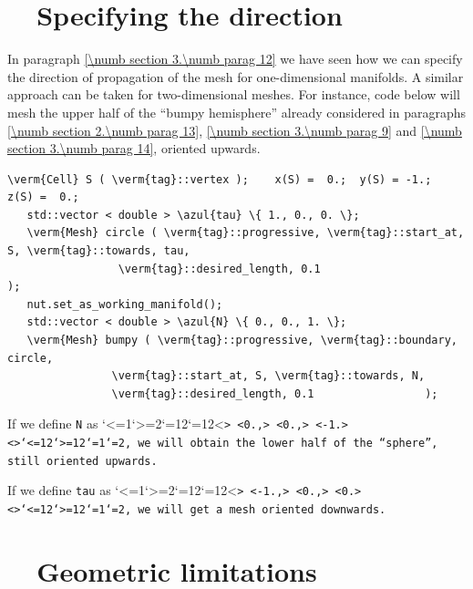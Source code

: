\section{~~Specifying the direction}\label{\numb section 3.\numb parag 15}

In paragraph \ref{\numb section 3.\numb parag 12} we have seen how we can specify the direction
of propagation of the mesh for one-dimensional manifolds.
A similar approach can be taken for two-dimensional meshes.
For instance, code below will mesh the upper half of the ``bumpy hemisphere'' already considered
in paragraphs \ref{\numb section 2.\numb parag 13}, \ref{\numb section 3.\numb parag 9} and
\ref{\numb section 3.\numb parag 14}, oriented upwards.

\begin{Verbatim}[commandchars=\\\{\},formatcom=\small\tt,frame=single,
   label=parag-\ref{\numb section 3.\numb parag 15}.cpp,rulecolor=\color{coment},
   baselinestretch=0.94,framesep=2mm                                            ]
   \verm{Cell} S ( \verm{tag}::vertex );    x(S) =  0.;  y(S) = -1.;  z(S) =  0.;
   std::vector < double > \azul{tau} \{ 1., 0., 0. \};
   \verm{Mesh} circle ( \verm{tag}::progressive, \verm{tag}::start_at, S, \verm{tag}::towards, tau,
                 \verm{tag}::desired_length, 0.1                               );
   nut.set_as_working_manifold();
   std::vector < double > \azul{N} \{ 0., 0., 1. \};
   \verm{Mesh} bumpy ( \verm{tag}::progressive, \verm{tag}::boundary, circle,
                \verm{tag}::start_at, S, \verm{tag}::towards, N,
                \verm{tag}::desired_length, 0.1                 );
\end{Verbatim}

If we define {\small\tt N} as \catcode`<=1\catcode`>=2\catcode`{=12\catcode`}=12<\small\tt {>
<\small\tt 0.,> <\small\tt 0.,> <\small\tt -1.> <\small\tt }>\catcode`<=12\catcode`>=12\catcode`{=1\catcode`}=2, we will obtain
the lower half of the ``sphere'', still oriented upwards.

If we define {\small\tt tau} as \catcode`<=1\catcode`>=2\catcode`{=12\catcode`}=12<\small\tt {>
<\small\tt -1.,> <\small\tt 0.,> <\small\tt 0.> <\small\tt }>\catcode`<=12\catcode`>=12\catcode`{=1\catcode`}=2, we will get a mesh
oriented downwards.


\section{~~Geometric limitations}\label{\numb section 3.\numb parag 16}

